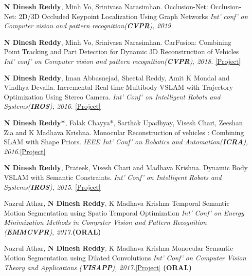 \documentclass[7pt]{article}
\begin{document}
\begin{small}
\vspace{-1 mm}
\textbf{N Dinesh Reddy}, Minh Vo, Srinivasa Narasimhan. Occlusion-Net: Occlusion-Net: 2D/3D Occluded Keypoint Localization Using Graph Networks {\sl Int' conf' on Computer vision and pattern recognition(\textbf{CVPR}), 2019.} 

\textbf{N Dinesh Reddy}, Minh Vo, Srinivasa Narasimhan. CarFusion: Combining Point Tracking and Part Detection for Dynamic 3D Reconstruction of Vehicles {\sl Int' conf' on Computer vision and pattern recognition(\textbf{CVPR}), 2018.}
\href{http://www.cs.cmu.edu/~ILIM/projects/IM/CarFusion/}{[Project]}

\textbf{N Dinesh Reddy}, Iman Abbasnejad, Sheetal Reddy, Amit K Mondal and Vindhya Devalla. Incremental Real-time Multibody VSLAM with Trajectory Optimization Using Stereo Camera. {\sl Int' Conf' on Intelligent Robots and Systems(\textbf{IROS}), 2016.} \href{http://ieeexplore.ieee.org/document/7759663/}{[Project]}



\textbf{N Dinesh Reddy*}, Falak Chayya*, Sarthak Upadhyay, Visesh Chari, Zeeshan Zia and K Madhava Krishna. Monocular Reconstruction of vehicles : Combining SLAM with Shape Priors. {\sl IEEE Int' Conf' on Robotics and Automation(\textbf{ICRA}), 2016.}\href{http://robotics.iiit.ac.in/people/falak.chhaya/Monocular_Reconstruction_of_Vehicles.html}{[Project]}


\textbf{N Dinesh Reddy}, Prateek, Visesh Chari and Madhava Krishna. Dynamic Body VSLAM with Semantic Constraints. {\sl Int' Conf' on Intelligent Robots and Systems(\textbf{IROS}), 2015.} \href{https://researchweb.iiit.ac.in/~dineshreddy.n/zerotype/projects/DB-VSLAM/}{[Project]}

Nazrul Athar, \textbf{N Dinesh Reddy}, K Madhava Krishna Temporal Semantic Motion Segmentation using Spatio Temporal Optimization {\sl Int' Conf' on Energy Minimization Methods in Computer Vision and Pattern Recognition (\textbf{EMMCVPR}), 2017.}\textbf{(ORAL)} 

Nazrul Athar, \textbf{N Dinesh Reddy}, K Madhava Krishna Monocular Semantic Motion Segmentation using Dilated
Convolutions {\sl Int' Conf' on Computer Vision Theory and Applications (\textbf{VISAPP}), 2017.}\href{http://robotics.iiit.ac.in/people/nazrul.athar/SMS/} {[Project]} \textbf{(ORAL)} 


\end{small}
\end{document}
